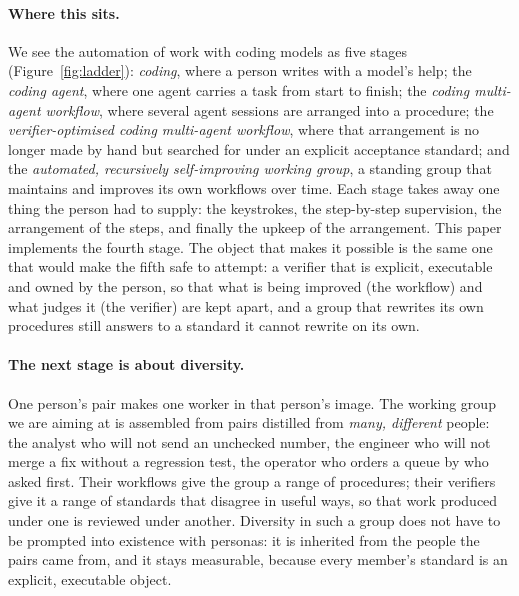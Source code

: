 \documentclass[10pt]{article}
\begin{document}
\paragraph{Where this sits.} We see the automation of work with coding models as five stages
(Figure~\ref{fig:ladder}): \emph{coding}, where a person writes with a model's help; the \emph{coding agent},
where one agent carries a task from start to finish; the \emph{coding multi-agent workflow}, where several agent
sessions are arranged into a procedure; the \emph{verifier-optimised coding multi-agent workflow}, where that
arrangement is no longer made by hand but searched for under an explicit acceptance standard; and the
\emph{automated, recursively self-improving working group}, a standing group that maintains and improves its own
workflows over time. Each stage takes away one thing the person had to supply: the keystrokes, the
step-by-step supervision, the arrangement of the steps, and finally the upkeep of the arrangement. This paper
implements the fourth stage. The object that makes it possible is the same one that would make the fifth safe to
attempt: a verifier that is explicit, executable and owned by the person, so that what is being improved (the
workflow) and what judges it (the verifier) are kept apart, and a group that rewrites its own procedures still
answers to a standard it cannot rewrite on its own.

\paragraph{The next stage is about diversity.} One person's pair makes one worker in that person's image. The
working group we are aiming at is assembled from pairs distilled from \emph{many, different} people: the analyst
who will not send an unchecked number, the engineer who will not merge a fix without a regression test, the
operator who orders a queue by who asked first. Their workflows give the group a range of procedures; their
verifiers give it a range of standards that disagree in useful ways, so that work produced under one is reviewed
under another. Diversity in such a group does not have to be prompted into existence with personas: it is
inherited from the people the pairs came from, and it stays measurable, because every member's standard is an
explicit, executable object.
\end{document}
